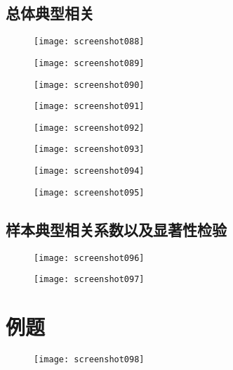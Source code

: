 \documentclass[11pt,a4paper,oneside]{book}
\begin{document}
\subsection{总体典型相关}
\begin{figure}[H]
	\centering
	\texttt{[image: screenshot088]}
\end{figure}
\begin{figure}[H]
	\centering
	\texttt{[image: screenshot089]}
\end{figure}
\begin{figure}[H]
	\centering
	\texttt{[image: screenshot090]}
\end{figure}
\begin{figure}[H]
	\centering
	\texttt{[image: screenshot091]}
\end{figure}
\begin{figure}[H]
	\centering
	\texttt{[image: screenshot092]}
\end{figure}
\begin{figure}[H]
	\centering
	\texttt{[image: screenshot093]}
\end{figure}
\begin{figure}[H]
	\centering
	\texttt{[image: screenshot094]}
\end{figure}
\begin{figure}[H]
	\centering
	\texttt{[image: screenshot095]}
\end{figure}
\subsection{样本典型相关系数以及显著性检验}
\begin{figure}[H]
	\centering
	\texttt{[image: screenshot096]}
\end{figure}
\begin{figure}[H]
	\centering
	\texttt{[image: screenshot097]}
\end{figure}

\section{例题}
\begin{figure}[H]
	\centering
	\texttt{[image: screenshot098]}
\end{figure}
\end{document}
